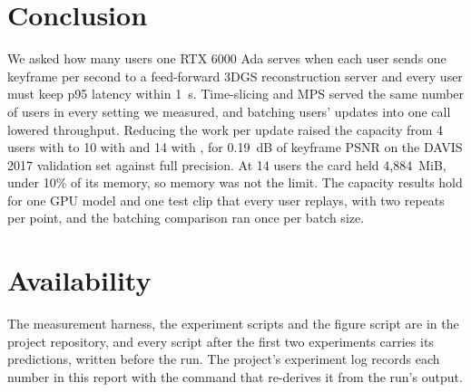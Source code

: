 \section{Conclusion}

We asked how many users one RTX 6000 Ada serves when each user sends one keyframe per second to a feed-forward 3DGS reconstruction server and every user must keep p95 latency within 1~s. %
Time-slicing and MPS served the same number of users in every setting we measured, and batching users' updates into one call lowered throughput. %
Reducing the work per update raised the capacity from 4 users with \serial{} to 10 with \opt{} and 14 with \optd{}, for 0.19~dB of keyframe PSNR on the DAVIS 2017 validation set against full precision. %
At 14 users the card held 4,884~MiB, under 10\% of its memory, so memory was not the limit. %
The capacity results hold for one GPU model and one test clip that every user replays, with two repeats per point, and the batching comparison ran once per batch size. %

\section*{Availability}

The measurement harness, the experiment scripts and the figure script are in the project repository, and every script after the first two experiments carries its predictions, written before the run. %
The project's experiment log records each number in this report with the command that re-derives it from the run's output.
